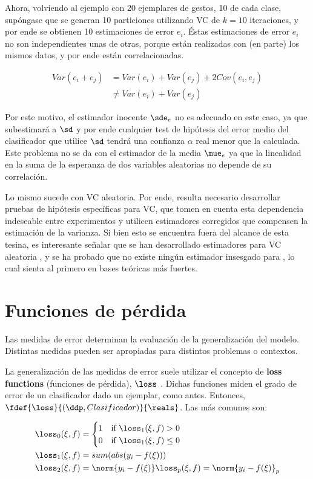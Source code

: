 Ahora, volviendo al ejemplo con 20 ejemplares de gestos, 10 de cada clase, supóngase que se generan 10 particiones utilizando VC de $k=10$ iteraciones, y por ende se obtienen 10 estimaciones de error $e_i$. Éstas estimaciones de error $e_i$ no son independientes unas de otras, porque están realizadas con (en parte) los mismos datos, y por ende están correlacionadas. 

\begin{align}
  Var(e_i+e_j) &=  Var(e_i) + Var(e_j) + 2 Cov(e_i,e_j) \\
  &\neq Var(e_i)+Var(e_j)
\end{align}

Por este motivo, el estimador inocente $\sde_e$ no es adecuado en este caso, ya que subestimará a $\sd$ y por ende cualquier test de hipótesis del error medio del clasificador que utilice $\sd$ tendrá una confianza $\alpha$ real menor que la calculada. Este problema no se da con el estimador de la media $\mue_e$ ya que la linealidad en la suma de la esperanza de dos variables aleatorias no depende de su correlación. 

Lo mismo sucede con VC aleatoria. Por ende, resulta necesario desarrollar pruebas de hipótesis específicas para VC, que tomen en cuenta esta dependencia indeseable entre experimentos y utilicen estimadores corregidos que compensen la estimación de la varianza. Si bien esto se encuentra fuera del alcance de esta tesina, es interesante señalar que se han desarrollado estimadores para VC aleatoria \cite{nadeau2003}, y se ha probado que no existe ningún estimador insesgado para  \kvc \cite{bengio2004}, lo cual sienta al primero en bases teóricas más fuertes.



\section{Funciones de pérdida}

Las medidas de error determinan la evaluación de la generalización del modelo. Distintas medidas pueden ser apropiadas para distintos problemas o contextos. 

La generalización de las medidas de error suele utilizar el concepto de \textbf{loss functions} (funciones de pérdida), $\loss$ \cite{wald1950}. Dichas funciones miden el grado de error de un clasificador dado un ejemplar, como antes. Entonces, $\fdef{\loss}{(\ddp,Clasificador)}{\reals}$. Las más comunes son:

\begin{align}
  \loss_0(\xi,f) &= \begin{cases}
  1 &\mbox{if } \loss_1(\xi,f) >0 \\  
  0 &\mbox{if } \loss_1(\xi,f) \leq 0      
  \end{cases}\\
  \loss_1(\xi,f) &= sum(abs(y_i-f(\xi))) \\
  \loss_2(\xi,f) &=  \norm{ y_i-f(\xi) } 
  \loss_p(\xi,f) =  \norm{ y_i-f(\xi) }_p 
\end{align}

